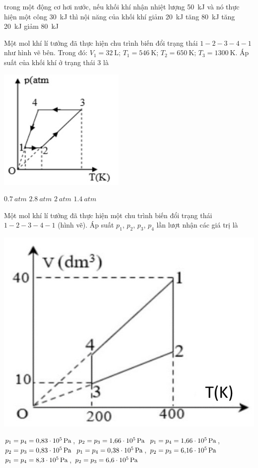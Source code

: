 \begin{ex}
	trong một động cơ hơi nước, nếu khối khí nhận nhiệt lượng \SI{50}{\kilo\joule} và nó thực hiện một công \SI{30}{\kilo\joule} thì nội năng của khối khí
	\choice
	{giảm \SI{20}{\kilo\joule}}
	{tăng \SI{80}{\kilo\joule}}
	{tăng \SI{20}{\kilo\joule}}
	{giảm \SI{80}{\kilo\joule}}
	\loigiai{}
\end{ex}
\begin{ex}
Một mol khí lí tưởng đã thực hiện chu trình biến đổi trạng thái $1-2-3-4-1$ như hình vẽ bên. Trong đó: $V_1=\SI{32}{\liter}$; $T_1=\SI{546}{\kelvin}$; $T_2=\SI{650}{\kelvin}$; $T_3=\SI{1300}{\kelvin}$. Áp suất của khối khí ở trạng thái 3 là
\begin{center}
	\includegraphics[width=0.3\linewidth]{figs/VN12-Y24-PH-SYL-014P-7}
\end{center}
	
	\choice
	{$\SI{0.7}{atm}$}
	{\True $\SI{2.8}{atm}$}
	{$\SI{2}{atm}$}
	{$\SI{1.4}{atm}$}
\end{ex}
\begin{ex}
Một mol khí lí tưởng đã thực hiện một chu trình biến đổi trạng thái $1-2-3-4-1$ (hình vẽ). Áp suất $p_1$, $p_2$, $p_3$, $p_4$ lần lượt nhận các giá trị là
\begin{center}
	\includegraphics[width=0.35\linewidth]{figs/VN12-Y24-PH-SYL-014P-8}
\end{center}
	
	\choice
	{\True $p_1=p_4=\SI{0.83E5}{\pascal}$, $p_2=p_3=\SI{1.66E5}{\pascal}$}
	{$p_1=p_4=\SI{1.66E5}{\pascal}$, $p_2=p_3=\SI{0.83E5}{\pascal}$}
	{$p_1=p_4=\SI{0.38E5}{\pascal}$, $p_2=p_3=\SI{6.16E5}{\pascal}$}
	{$p_1=p_4=\SI{8.3E5}{\pascal}$, $p_2=p_3=\SI{6.6E5}{\pascal}$}
\end{ex}
